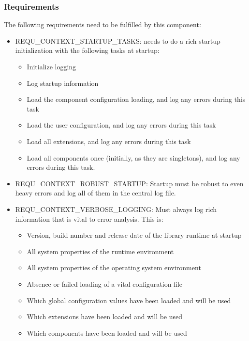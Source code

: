 \subsubsection{\COMPcontext{} Requirements}
\label{sec:COMPcontextRequirements}

\newcommand{\REQUcontextStartupTasks}{REQU\_CONTEXT\_STARTUP\_TASKS}
\newcommand{\REQUcontextRobustStartup}{REQU\_CONTEXT\_ROBUST\_STARTUP}
\newcommand{\REQUcontextVerboseLogging}{REQU\_CONTEXT\_VERBOSE\_LOGGING}

The following requirements need to be fulfilled by this component:
\begin{itemize}
	\item \REQUcontextStartupTasks{}: \COMPcontext{} needs to do a rich startup initialization with the following tasks at \LibName{} startup:
	\begin{itemize}
		\item Initialize logging
		\item Log \LibName{} startup information
		\item Load the component configuration loading, and log any errors during this task
		\item Load the user configuration, and log any errors during this task
		\item Load all extensions, and log any errors during this task
		\item Load all components once (initially, as they are singletons), and log any errors 				during this task.
	\end{itemize}
	\item \REQUcontextRobustStartup{}: Startup must be robust to even heavy errors and log all of them in the central log file.
	\item \REQUcontextVerboseLogging{}: Must always log rich information that is vital to error analysis. This is:
	\begin{itemize}
		\item Version, build number and release date of the library runtime at startup
		\item All system properties of the runtime environment
		\item All system properties of the operating system environment
		\item Absence or failed loading of a vital configuration file
		\item Which global configuration values have been loaded and will be used
		\item Which extensions have been loaded and will be used
		\item Which components have been loaded and will be used
	\end{itemize}
\end{itemize}

